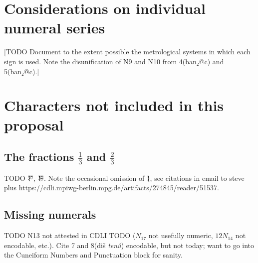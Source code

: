 \documentclass[10pt, a4paper, twoside]{article}
\begin{document}
\section{Considerations on individual numeral series}
[TODO Document to the extent possible the metrological systems in which each sign is used.
Note the disunification of N9 and N10 from 4(ban₂@c) and 5(ban₂@c).]

\section{Characters not included in this proposal}
\subsection{The fractions $\frac13$ and $\frac23$}
TODO {\xsuxfont 𒑝}, {\xsuxfont 𒑞}. Note the occasional omission of {\xsuxfont 𒋙},
see citations in email to steve plus https://cdli.mpiwg-berlin.mpg.de/artifacts/274845/reader/51537.
\subsection{Missing numerals}
TODO N13 not attested in CDLI 
TODO ($N_{17}$ not usefully numeric, $12N_{14}$ not encodable, etc.). Cite \cite[147]{DamerowEnglund1987}
7 and 8(diš \emph{tenû}) encodable, but not today; want to go into the Cuneiform Numbers and Punctuation block for sanity.
\end{document}
